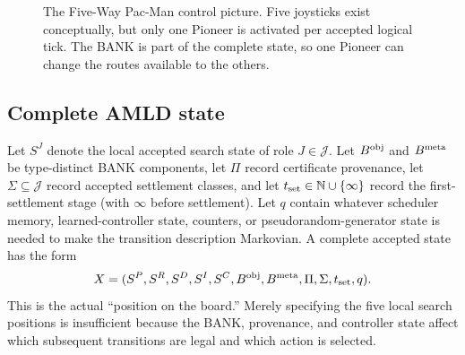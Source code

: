 \documentclass[11pt]{article}
\theoremstyle{remark}
\newcommand{\N}{\mathbb N}
\newcommand{\Roles}{\mathcal J}
\begin{document}
\begin{figure}[ht]
\centering
{}
\caption{The Five-Way Pac-Man control picture. Five joysticks exist conceptually, but only one Pioneer is activated per accepted logical tick. The BANK is part of the complete state, so one Pioneer can change the routes available to the others.}
\label{fig:fiveway}
\end{figure}

\subsection{Complete AMLD state}

Let $S^J$ denote the local accepted search state of role $J\in\Roles$. Let $B^{\rm obj}$ and $B^{\rm meta}$ be type-distinct BANK components, let $\Pi$ record certificate provenance, let $\Sigma\subseteq\Roles$ record accepted settlement classes, and let $t_{\rm set}\in\N\cup\{\infty\}$ record the first-settlement stage (with $\infty$ before settlement). Let $q$ contain whatever scheduler memory, learned-controller state, counters, or pseudorandom-generator state is needed to make the transition description Markovian. A complete accepted state has the form
\[
X=(S^P,S^R,S^D,S^I,S^C,B^{\rm obj},B^{\rm meta},\Pi,\Sigma,t_{\rm set},q).
\]
This is the actual ``position on the board.'' Merely specifying the five local search positions is insufficient because the BANK, provenance, and controller state affect which subsequent transitions are legal and which action is selected.
\end{document}
